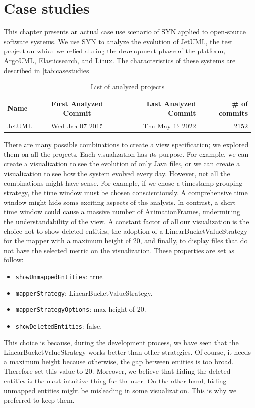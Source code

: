 
\chapter[Case studies]{Case studies}
\graphicspath{ {images/casestudies} }

This chapter presents an actual case use scenario of SYN applied to open-source software systems. 
We use SYN to analyze the evolution of JetUML, the test project on which we relied during the development phase of the platform, ArgoUML, Elasticsearch, and Linux. 
The characteristics of these systems are described in \autoref{tab:casestudies}

\begin{table}[ht]
    \centering
    \begin{tabular}{lcrr} 
        \hline
        {\bf Name} & {\bf First Analyzed Commit} & {\bf Last Analyzed Commit} & {\bf \# of commits}\\ 
        \hline
        JetUML & Wed Jan 07 2015 &  Thu May 12 2022  &  2152  
    \end{tabular}
    \caption{List of analyzed projects}
    \label{tab:casestudies}
\end{table}

\bigbreak
There are many possible combinations to create a view specification; we explored them on all the projects. 
Each visualization has its purpose. For example, we can create a visualization to see the evolution of only Java files, or we can create a visualization to see how the system evolved every day. 
However, not all the combinations might have sense. For example, if we chose a timestamp grouping strategy, the time window must be chosen conscientiously. 
A comprehensive time window might hide some exciting aspects of the analysis. In contrast, a short time window could cause a massive number of AnimationFrames, undermining the understandability of the view. 
\bigbreak
A constant factor of all our visualization is the choice not to show deleted entities, the adoption of a LinearBucketValueStrategy for the mapper with a maximum height of 20, and finally, to display files that do not have the selected metric on the visualization. 
These properties are set as follow:
\begin{itemize}
    \item \texttt{showUnmappedEntities}: true.
    \item \texttt{mapperStrategy}: LinearBucketValueStrategy.
    \item \texttt{mapperStrategyOptions}: max height of 20.
    \item \texttt{showDeletedEntities}: false.
\end{itemize}
This choice is because, during the development process, we have seen that the LinearBucketValueStrategy works better than other strategies. Of course, it needs a maximum height because otherwise, the gap between entities is too broad. Therefore set this value to 20. Moreover, we believe that hiding the deleted entities is the most intuitive thing for the user. On the other hand, hiding unmapped entities might be misleading in some visualization. This is why we preferred to keep them. 

